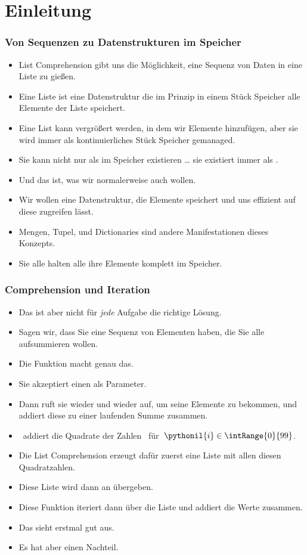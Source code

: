 \documentclass[aspectratio=169,mathserif,notheorems]{beamer}%
\subtitle{38.~Generator-Ausdrücke}%
\begin{document}
%
%
\startPresentation%
%
\section{Einleitung}%
\begin{frame}%
\frametitle{Von Sequenzen zu Datenstrukturen im Speicher}%
\begin{itemize}%
\item List Comprehension gibt uns die Möglichkeit, eine Sequenz von Daten in eine Liste zu gießen.%
%
\item<2-> Eine Liste ist eine Datenstruktur die im Prinzip in einem Stück Speicher alle Elemente der Liste speichert.%
%
\item<3-> Eine List kann vergrößert werden, in dem wir Elemente hinzufügen, aber sie wird immer als kontinuierliches Stück Speicher gemanaged.%
%
\item<4-> Sie kann nicht nur als  im Speicher existieren {\dots} sie existiert immer als .%
%
\item<5-> Und das ist, was wir normalerweise auch wollen.%
%
\item<6-> Wir wollen eine Datenstruktur, die Elemente speichert und uns effizient auf diese zugreifen lässt.%
%
\item<7-> Mengen, Tupel, und Dictionaries sind andere Manifestationen dieses Konzepts.%
%
\item<8-> Sie alle halten alle ihre Elemente komplett im Speicher.%
\end{itemize}
\end{frame}%
%
\begin{frame}%
\frametitle{Comprehension und Iteration}%
%
\begin{itemize}%
\item Das ist aber nicht für \emph{jede} Aufgabe die richtige Lösung.%
%
\item<2-> Sagen wir, dass Sie eine Sequenz von Elementen haben, die Sie alle aufsummieren wollen.%
%
\item<3-> Die Funktion  macht genau das\cite{PSF:P3D:TPSL:BIF}.%
%
\item<4-> Sie akzeptiert einen  als Parameter\cite{PSF:P3D:TPSL:BIF}.%
%
\item<5-> Dann ruft sie wieder und wieder  auf, um seine Elemente zu bekommen, und addiert diese zu einer laufenden Summe zusammen.%
%
\item<6->  \DEzB\ addiert die Quadrate der Zahlen~ für~$\pythonil{i}\in\intRange{0}{99}$.%
%
\item<7-> Die List Comprehension erzeugt dafür zuerst eine Liste mit allen diesen Quadratzahlen.%
%
\item<8-> Diese Liste wird dann an  übergeben.%
%
\item<9-> Diese Funktion iteriert dann über die Liste und addiert die Werte zusammen.%
%
\item<10-> Das sieht erstmal gut aus.%
%
\item<11-> \alert{Es hat aber einen Nachteil.}%
\end{itemize}%
\end{frame}%
\end{document}
